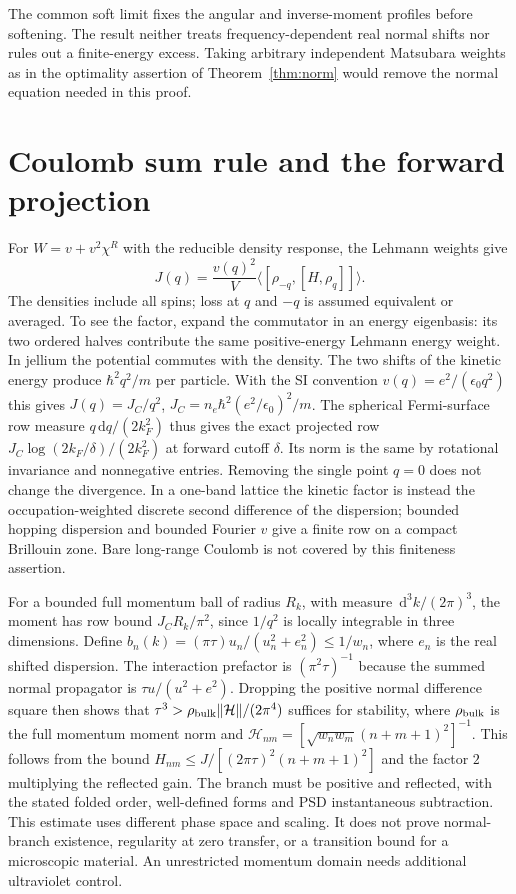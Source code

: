 \documentclass[11pt]{article}
\newcommand{\dd}{\,\mathrm{d}}
\begin{document}
The common soft limit fixes the angular and inverse-moment profiles before softening. The result neither treats frequency-dependent real normal shifts nor rules out a finite-energy excess. Taking arbitrary independent Matsubara weights as in the optimality assertion of Theorem~\ref{thm:norm} would remove the normal equation needed in this proof.

\section{Coulomb sum rule and the forward projection}
For $W=v+v^2\chi^R$ with the reducible density response, the Lehmann weights give
\[
 J(q)=\frac{v(q)^2}{V}\langle[\rho_{-q},[H,\rho_q]]\rangle.
\]
The densities include all spins; loss at $q$ and $-q$ is assumed equivalent or averaged. To see the factor, expand the commutator in an energy eigenbasis: its two ordered halves contribute the same positive-energy Lehmann energy weight. In jellium the potential commutes with the density. The two shifts of the kinetic energy produce $\hbar^2 q^2/m$ per particle. With the SI convention $v(q)=e^2/(\epsilon_0 q^2)$ this gives $J(q)=J_C/q^2$, $J_C=n_e\hbar^2(e^2/\epsilon_0)^2/m$. The spherical Fermi-surface row measure $q\dd q/(2k_F^2)$ thus gives the exact projected row $J_C\log(2k_F/\delta)/(2k_F^2)$ at forward cutoff $\delta$. Its norm is the same by rotational invariance and nonnegative entries. Removing the single point $q=0$ does not change the divergence. In a one-band lattice the kinetic factor is instead the occupation-weighted discrete second difference of the dispersion; bounded hopping dispersion and bounded Fourier $v$ give a finite row on a compact Brillouin zone. Bare long-range Coulomb is not covered by this finiteness assertion.

For a bounded full momentum ball of radius $R_k$, with measure $\dd^3 k/(2\pi)^3$, the moment has row bound $J_C R_k/\pi^2$, since $1/q^2$ is locally integrable in three dimensions. Define $b_n(k)=(\pi\tau)u_n/(u_n^2+e_n^2)\le1/w_n$, where $e_n$ is the real shifted dispersion. The interaction prefactor is $(\pi^2\tau)^{-1}$ because the summed normal propagator is $\tau u/(u^2+e^2)$. Dropping the positive normal difference square then shows that $\tau^3>\rho_{\rm bulk}\|\mathcal H\|/(2\pi^4)$ suffices for stability, where $\rho_{\rm bulk}$ is the full momentum moment norm and $\mathcal H_{nm}=[\sqrt{w_nw_m}(n+m+1)^2]^{-1}$. This follows from the bound $H_{nm}\le J/[(2\pi\tau)^2(n+m+1)^2]$ and the factor $2$ multiplying the reflected gain. The branch must be positive and reflected, with the stated folded order, well-defined forms and PSD instantaneous subtraction. This estimate uses different phase space and scaling. It does not prove normal-branch existence, regularity at zero transfer, or a transition bound for a microscopic material. An unrestricted momentum domain needs additional ultraviolet control.
\end{document}
